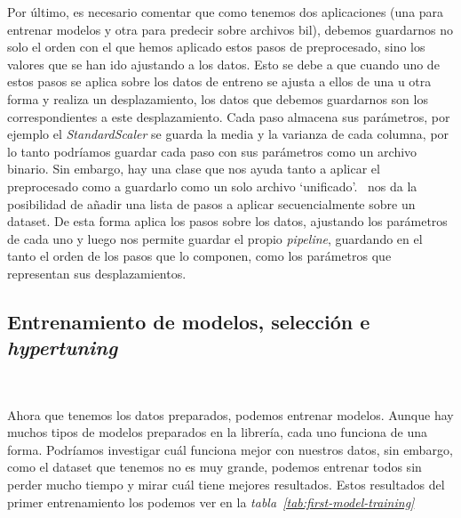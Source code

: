 Por último, es necesario comentar que como tenemos dos aplicaciones (una para entrenar modelos y otra para predecir sobre archivos \gls{bil}),
debemos guardarnos no solo el orden con el que hemos aplicado estos pasos de preprocesado, sino los valores que se han ido ajustando a los datos.
Esto se debe a que cuando uno de estos pasos se aplica sobre los datos de entreno se ajusta a ellos de una u otra forma y realiza un desplazamiento, los datos que debemos guardarnos
son los correspondientes a este desplazamiento. Cada paso almacena sus parámetros, por ejemplo el \textit{StandardScaler} se guarda la media y la varianza de cada columna,
por lo tanto podríamos guardar cada paso con sus parámetros como un archivo binario. Sin embargo, hay una clase que nos ayuda tanto a aplicar el preprocesado como a guardarlo como un solo
archivo `unificado'.\  nos da la posibilidad de añadir 
una lista de pasos a aplicar secuencialmente sobre un \gls{dataset}. De esta forma aplica los pasos sobre los datos, ajustando los parámetros de cada uno y luego nos permite
guardar el propio \textit{pipeline}, guardando en el tanto el orden de los pasos que lo componen, como los parámetros que representan sus desplazamientos.\ \cite{sklearnp32:online}


\subsection{Entrenamiento de modelos, selección e \textit{hypertuning}}\ \label{sec:entrenamiento}

Ahora que tenemos los datos preparados, podemos entrenar modelos. Aunque hay muchos tipos de modelos preparados en la librería, cada uno funciona de una forma. Podríamos investigar cuál funciona mejor con nuestros datos, sin embargo, como el \gls{dataset} que tenemos no es muy grande, podemos entrenar todos sin perder mucho tiempo y mirar cuál tiene mejores resultados. Estos resultados del primer entrenamiento los podemos ver en la \textit{tabla\ \ref{tab:first-model-training}}


